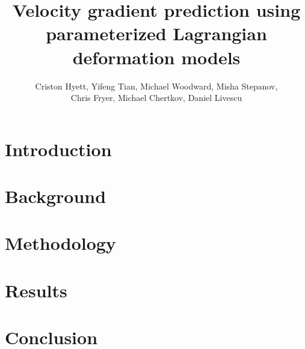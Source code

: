 \documentclass[12pt]{article}
\title{Velocity gradient prediction using parameterized Lagrangian deformation models}
\author{Criston Hyett, Yifeng Tian, Michael Woodward, Misha Stepanov,\\ Chris Fryer, Michael Chertkov, Daniel Livescu}
\newcommand{\<}{\langle}
\renewcommand{\>}{\rangle}
\begin{document}
\maketitle
\abstract{

}

\section{Introduction} \label{sec:intro}


\section{Background} \label{sec:prev_work}


\section{Methodology} \label{sec:methods}


\section{Results} \label{sec:results}


\section{Conclusion} \label{sec:conclusion}


% 



\end{document}
